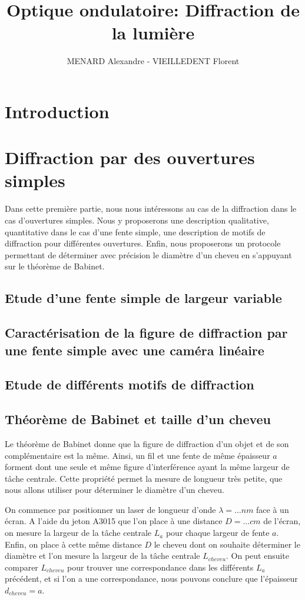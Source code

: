 \documentclass[12pt]{article}
\title{\textbf{Optique ondulatoire:} Diffraction de la lumière}
\author{MENARD Alexandre - VIEILLEDENT Florent}
\begin{document}
\maketitle

\section*{Introduction}

\section{Diffraction par des ouvertures simples}
Dans cette première partie, nous nous intéressons au cas de la diffraction dans le cas d'ouvertures simples. Nous y proposerons une description qualitative, quantitative dans le cas d'une fente simple,
une description de motifs de diffraction pour différentes ouvertures. Enfin, nous proposerons un protocole permettant de déterminer avec précision le diamètre d'un cheveu en s'appuyant sur le théorème de Babinet.
\subsection{Etude d'une fente simple de largeur variable}

\subsection{Caractérisation de la figure de diffraction par une fente simple avec une caméra linéaire}

\subsection{Etude de différents motifs de diffraction}

\break
\subsection{Théorème de Babinet et taille d'un cheveu}
Le théorème de Babinet donne que la figure de diffraction d'un objet et de son complémentaire est la même.
Ainsi, un fil et une fente de même épaisseur $a$ forment dont une seule et même figure d'interférence ayant la même largeur de tâche centrale. Cette propriété permet la mesure de longueur très petite, que nous allons utiliser
pour déterminer le diamètre d'un cheveu.

On commence par positionner un laser de longueur d'onde $\lambda = \dots nm$ face à un écran. A l'aide du jeton A3015 que l'on place à une distance $D = \dots cm$ de
l'écran, on mesure la largeur de la tâche centrale $L_a$ pour chaque largeur de fente $a$. Enfin, on place à cette même distance $D$ le cheveu dont on souhaite déterminer
le diamètre et l'on mesure la largeur de la tâche centrale $L_{cheveu}$. On peut ensuite comparer $L_{cheveu}$ pour trouver une correspondance dans les différents $L_a$ précédent, et si l'on a une 
correspondance, nous pouvons conclure que l'épaisseur $d_{cheveu} = a$.
\end{document}

